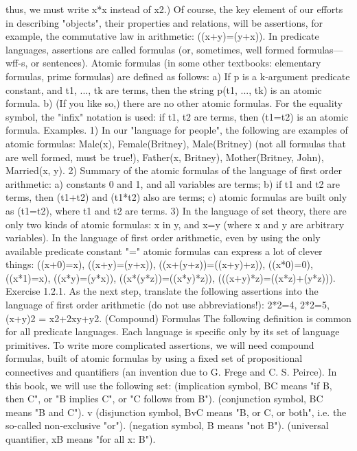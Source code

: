 thus, we must write x*x instead of x2.)
Of course, the key element of our efforts in describing "objects", their properties and relations, will be
assertions, for example, the commutative law in arithmetic: ((x+y)=(y+x)). In predicate languages,
assertions are called formulas (or, sometimes, well formed formulas---wff-s, or sentences).
Atomic formulas (in some other textbooks: elementary formulas, prime formulas) are defined as follows:
a) If p is a k-argument predicate constant, and t1, ..., tk are terms, then the string p(t1, ..., tk) is an atomic
formula.
b) (If you like so,) there are no other atomic formulas.
For the equality symbol, the "infix" notation is used: if t1, t2 are terms, then (t1=t2) is an atomic formula.
Examples. 1) In our "language for people", the following are examples of atomic formulas: Male(x), Female(Britney),
Male(Britney) (not all formulas that are well formed, must be true!), Father(x, Britney), Mother(Britney, John), Married(x, y).
2) Summary of the atomic formulas of the language of first order arithmetic: a) constants 0 and 1, and all variables are terms;
b) if t1 and t2 are terms, then (t1+t2) and (t1*t2) also are terms; c) atomic formulas are built only as (t1=t2), where t1 and t2 are
terms.
3) In the language of set theory, there are only two kinds of atomic formulas: x in y, and x=y (where x and y are arbitrary
variables).
In the language of first order arithmetic, even by using the only available predicate constant "=" atomic
formulas can express a lot of clever things:
((x+0)=x), ((x+y)=(y+x)), ((x+(y+z))=((x+y)+z)),
((x*0)=0), ((x*1)=x), ((x*y)=(y*x)), ((x*(y*z))=((x*y)*z)),
(((x+y)*z)=((x*z)+(y*z))).
Exercise 1.2.1. As the next step, translate the following assertions into the language of first order
arithmetic (do not use abbreviations!): 2*2=4, 2*2=5, (x+y)2 = x2+2xy+y2.
(Compound) Formulas
The following definition is common for all predicate languages. Each language is specific only by its
set of language primitives.
To write more complicated assertions, we will need compound formulas, built of atomic formulas by
using a fixed set of propositional connectives and quantifiers (an invention due to G. Frege and C. S.
Peirce). In this book, we will use the following set:
\IMPLIES  (implication symbol, B\IMPLIES C means "if B, then C", or "B implies C", or "C follows from B").
\AND  (conjunction symbol, B\AND C means "B and C").
v (disjunction symbol, BvC means "B, or C, or both", i.e. the so-called non-exclusive "or").
\neg  (negation symbol, \neg B means "not B").
\forall  (universal quantifier, \forall xB means "for all x: B").
